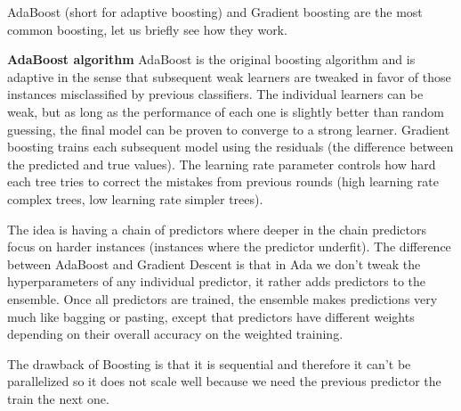 \documentclass[11pt]{article}
\theoremstyle{definition}
\theoremstyle{remark}
\begin{document}
AdaBoost (short for adaptive boosting) and Gradient boosting are the most common boosting, let us briefly see how they work.

\textbf{AdaBoost algorithm}
AdaBoost is the original boosting algorithm and is adaptive in the sense that subsequent weak learners are tweaked in favor of those instances misclassified by previous classifiers. 
The individual learners can be weak, but as long as the performance of each one is slightly better than random guessing, the final model can be proven to converge to a strong learner. Gradient boosting trains each subsequent model using the residuals (the difference between the predicted and true values). The learning rate parameter controls how hard each tree tries to correct the mistakes from previous rounds (high learning rate complex trees, low learning rate simpler trees). 

The idea is having a chain of predictors where deeper in the chain predictors focus on harder instances (instances where the predictor underfit). The difference between AdaBoost and Gradient Descent is that in Ada we don't tweak the hyperparameters of any individual predictor, it rather adds predictors to the ensemble. Once all predictors are trained, the ensemble makes predictions very much like bagging or pasting, except that predictors have different weights depending on their overall accuracy on the weighted training.

The drawback of Boosting is that it is sequential and therefore it can't be parallelized so it does not scale well because we need the previous predictor the train the next one.
\end{document}
